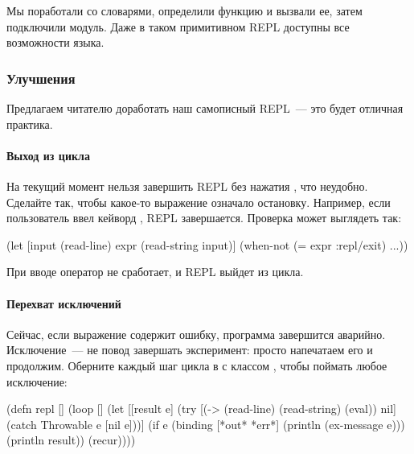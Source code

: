 Мы поработали со словарями, определили функцию и вызвали ее, затем подключили модуль. Даже в таком примитивном REPL доступны все возможности языка.

\subsubsection{Улучшения}

Предлагаем читателю доработать наш самописный REPL~--- это будет отличная практика.

\paragraph{Выход из цикла}

На текущий момент нельзя завершить REPL без нажатия , что неудобно. Сделайте так, чтобы какое-то выражение означало остановку. Например, если пользователь ввел кейворд , REPL завершается. Проверка может выглядеть так:

\begin{english}
  \begin{clojure}
(let [input (read-line)
      expr (read-string input)]
  (when-not (= expr :repl/exit)
    ...))
  \end{clojure}
\end{english}

При вводе  оператор  не сработает, и REPL выйдет из цикла.

\paragraph{Перехват исключений}

Сейчас, если выражение содержит ошибку, программа завершится аварийно. Исключение~--- не повод завершать эксперимент: просто напечатаем его и продолжим. Оберните каждый шаг цикла в  с классом , чтобы поймать любое исключение:

\begin{english}
  \begin{clojure}
(defn repl []
  (loop []
    (let [[result e]
          (try
            [(-> (read-line)
                 (read-string)
                 (eval))
             nil]
            (catch Throwable e
              [nil e]))]
      (if e
        (binding [*out* *err*]
          (println (ex-message e)))
        (println result))
      (recur))))
  \end{clojure}
\end{english}

